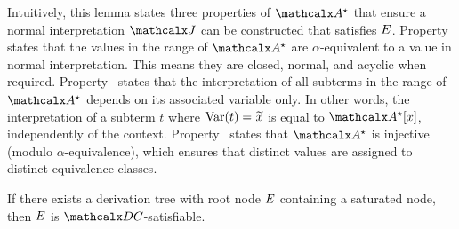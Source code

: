 Intuitively, this lemma states three properties of $\ValC$ that ensure a normal
interpretation $\J$ can be constructed that satisfies $E$. Property~ states that the
values in the range of $\ValC$ are $\alpha$-equivalent to a value in normal
interpretation. This means they are closed, normal, and acyclic when
required. Property~ states that the interpretation of all subterms in the
range of $\ValC$ depends on its associated variable only. In other words, the
interpretation of a subterm $t$ where $\muvar(t) = {\Varec{x}}$ is equal to
$\ValC \ec{x}$, independently of the context. %
Property~ states that $\ValC$ is injective (modulo
$\alpha$-equivalence), which ensures %
that distinct values are
assigned to distinct equivalence classes.

\begin{theorem}%
\label{thm:ss}%
\afterDot
If there exists a derivation tree with root node $E$ containing a saturated node, then $E$ is $\thD$-satisfiable.
\end{theorem}
